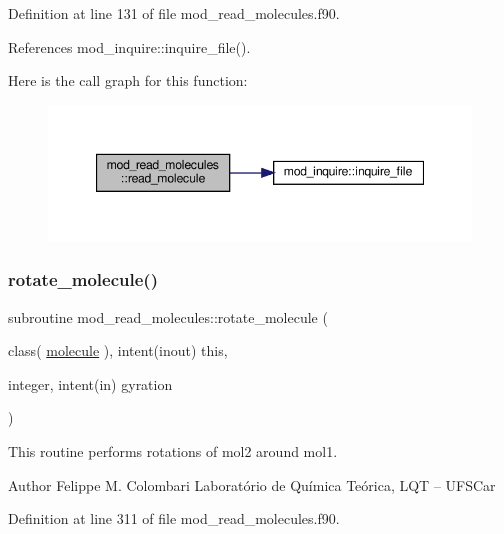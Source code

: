 Definition at line 131 of file mod\+\_\+read\+\_\+molecules.\+f90.



References mod\+\_\+inquire\+::inquire\+\_\+file().

Here is the call graph for this function\+:
\nopagebreak
\begin{figure}[H]
\begin{center}
\leavevmode
\includegraphics[width=347pt]{namespacemod__read__molecules_a61dd5623986abe13f76dfed8a5ad1e35_cgraph}
\end{center}
\end{figure}
\mbox{\label{namespacemod__read__molecules_a3b4923002ba2fa7a6438df2afa80d406}} 
\subsubsection{\texorpdfstring{rotate\+\_\+molecule()}{rotate\_molecule()}}
{\footnotesize\ttfamily subroutine mod\+\_\+read\+\_\+molecules\+::rotate\+\_\+molecule (\begin{DoxyParamCaption}\item[{class( \hyperlink{structmod__read__molecules_1_1molecule}{molecule} ), intent(inout)}]{this,  }\item[{integer, intent(in)}]{gyration }\end{DoxyParamCaption})}



This routine performs rotations of mol2 around mol1. 

\begin{DoxyAuthor}{Author}
Felippe M. Colombari Laboratório de Química Teórica, L\+QT -- U\+F\+S\+Car 
\end{DoxyAuthor}


Definition at line 311 of file mod\+\_\+read\+\_\+molecules.\+f90.



